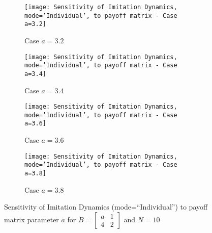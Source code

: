 	\begin{figure}[h]
		\centering
		\begin{subfigure}{.49\textwidth}
			\centering
			\texttt{[image: Sensitivity of Imitation Dynamics, mode='Individual', to payoff matrix - Case a=3.2]}
			\caption{Case $a=3.2$}
			\label{fig:example22}
		\end{subfigure}
		\begin{subfigure}{.49\textwidth}
			\centering
			\texttt{[image: Sensitivity of Imitation Dynamics, mode='Individual', to payoff matrix - Case a=3.4]}
			\caption{Case $a=3.4$}
			\label{fig:example23}
		\end{subfigure}
		\vspace{0.5em}
		\begin{subfigure}{.49\textwidth}
			\centering
			\texttt{[image: Sensitivity of Imitation Dynamics, mode='Individual', to payoff matrix - Case a=3.6]}
			\caption{Case $a=3.6$}
			\label{fig:example24}
		\end{subfigure}
		\begin{subfigure}{.49\textwidth}
			\centering
			\texttt{[image: Sensitivity of Imitation Dynamics, mode='Individual', to payoff matrix - Case a=3.8]}
			\caption{Case $a=3.8$}
			\label{fig:example25}
		\end{subfigure}
		\caption{Sensitivity of Imitation Dynamics (mode=``Individual'') to payoff matrix parameter $a$ for $B = \begin{bmatrix} a & 1 \\ 4 & 2 \end{bmatrix}$ and $N=10$}
		\label{fig:Sensitivity of Imitation Dynamics, mode='Individual', to payoff matrix}
	\end{figure}
	
